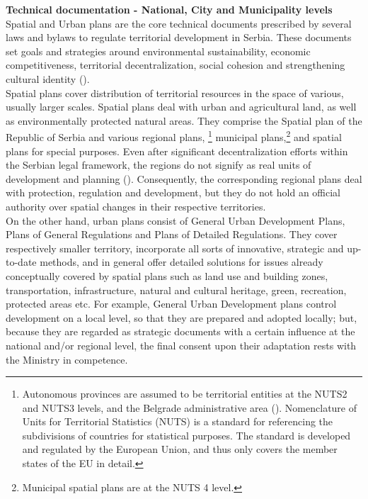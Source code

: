 \documentclass[11pt]{report}
\begin{document}
{{{{\textbf{Technical documentation - National, City and Municipality levels}
\\
Spatial and Urban plans are the core technical documents prescribed by several laws and bylaws to regulate territorial development in Serbia.
These documents set goals and strategies around environmental sustainability, economic competitiveness, territorial decentralization, social cohesion and strengthening cultural identity (\href{Hirt}{\citealt{hirt_belgrade_2009}}).
\\
Spatial plans cover distribution of territorial resources in the space of various, usually larger scales. Spatial plans deal with urban and agricultural land, as well as environmentally protected natural areas. They comprise the Spatial plan of the Republic of Serbia and various regional plans,
\footnote{Autonomous provinces are assumed to be territorial  entities  at  the  NUTS2  and NUTS3  levels,  and the Belgrade administrative  area (\href{Vujosevic}{\citealt{vujosevic_planning_2006}}). Nomenclature of Units for Territorial Statistics (NUTS) is a standard for referencing the subdivisions of countries for statistical purposes. The standard is developed and regulated by the European Union, and thus only covers the member states of the EU in detail.}
municipal plans,\footnote{Municipal  spatial plans are at the NUTS 4 level.}
and spatial plans for special purposes.
Even after significant decentralization efforts within the Serbian legal framework, the regions do not signify as real units of development and planning (\href{Vujosevic}{\citealt{vujosevic_regionalizam_2015}}). Consequently, the corresponding regional plans deal with protection, regulation and development, but they do not hold an official authority over spatial changes in their respective territories.
\\

On the other hand, urban plans consist of General Urban Development Plans, Plans of General Regulations and Plans of Detailed Regulations. They cover respectively smaller territory, incorporate all sorts of innovative, strategic and up-to-date methods, and in general offer detailed solutions for issues already conceptually covered by spatial plans such as land use and building zones, transportation, infrastructure, natural and cultural heritage, green, recreation, protected areas etc. For example, General Urban Development plans control development on a local level, so that they are prepared and adopted locally; but, because they are regarded as strategic documents with a certain influence at the national and/or regional level, the final consent upon their adaptation rests with the Ministry in competence. 
\\

}}}}
\end{document}
